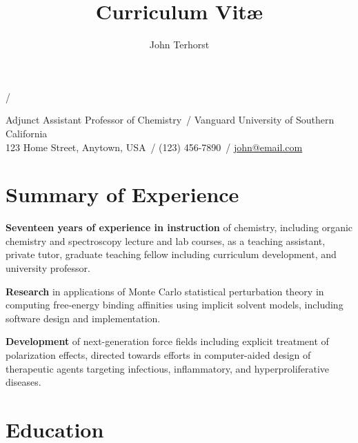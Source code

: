 \documentclass[10pt]{article}
\author{John Terhorst}
\title{Curriculum Vit\ae}
\makeatletter
\def\mycolor{Red}%
\def\position{Adjunct Assistant Professor of Chemistry}
\def\currempl{Vanguard University of Southern California}
\def\address{55 Fair Drive, Costa Mesa, California 92626}
\def\dept{School of Natural Sciences and Mathematics}
\renewcommand{\maketitle}{
			{\huge{\color{\mycolor}\textbf{\theauthor}} / \hspace{-0.5mm}\thetitle}

			\position\ / \dept \\
			\currempl\ / \address

			\vspace*{0pt}
			}
\def\address{123 Home Street, Anytown, USA}
\def\phone{(123) 456-7890}
\def\mymail{\email{john@email.com}}
\renewcommand{\maketitle}{
			{\huge{\color{\mycolor}\textbf{\theauthor}} / \hspace{-0.5mm}\thetitle}

			\position\ / \currempl \\
			\address\ / \phone\ / \mymail 

			\vspace*{0pt}
			}
\newcommand*\email[1]{\href{mailto:#1}{#1}}
\newcommand*\paritem[2]{\textbf{#1} #2}
\makeatother
\begin{document}

\maketitle


\section{Summary of Experience}


\paritem{Seventeen years of experience in instruction} {of chemistry, including organic chemistry and spectroscopy lecture and lab courses, as a teaching assistant, private tutor, graduate teaching fellow including curriculum development, and university professor.}

\paritem{Research} {in applications of Monte Carlo statistical perturbation theory in computing free-energy binding affinities using implicit solvent models, including software design and implementation.} 

\paritem{Development} {of next-generation force fields including explicit treatment of polarization effects, directed towards efforts in computer-aided design of therapeutic agents targeting infectious, inflammatory, and hyperproliferative diseases.}


\section{Education}
\end{document}
